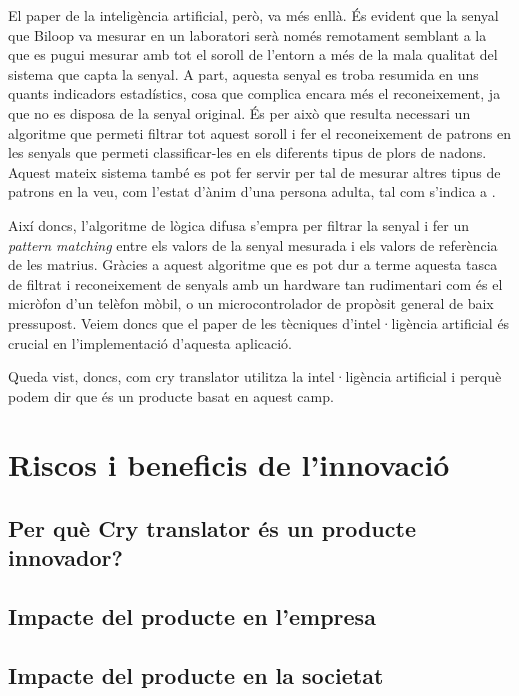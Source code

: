 \documentclass[11pt,a4paper]{article}
\begin{document}
El paper de la inteligència artificial, però, va més enllà. És evident que la senyal que Biloop va mesurar en un laboratori serà només remotament semblant a la que es pugui mesurar amb tot el soroll de l'entorn a més de la mala qualitat del sistema que capta la senyal. A part, aquesta senyal es troba resumida en uns quants indicadors estadístics, cosa que complica encara més el reconeixement, ja que no es disposa de la senyal original. És per això que resulta necessari un algoritme que permeti filtrar tot aquest soroll i fer el reconeixement de patrons en les senyals que permeti classificar-les en els diferents tipus de plors de nadons. Aquest mateix sistema també es pot fer servir per tal de mesurar altres tipus de patrons en la veu, com l'estat d'ànim d'una persona adulta, tal com s'indica a \cite{patent}.

Així doncs, l'algoritme de lògica difusa s'empra per filtrar la senyal i fer un \emph{pattern matching} entre els valors de la senyal mesurada i els valors de referència de les matrius. Gràcies a aquest algoritme que es pot dur a terme aquesta tasca de filtrat i reconeixement de senyals amb un hardware tan rudimentari com és el micròfon d'un telèfon mòbil, o un microcontrolador de propòsit general de baix pressupost. Veiem doncs que el paper de les tècniques d'intel·ligència artificial és crucial en l'implementació d'aquesta aplicació.

Queda vist, doncs, com cry translator utilitza la intel·ligència artificial i perquè podem dir que és un producte basat en aquest camp.

\section{\textsf{Riscos i beneficis de l'innovació}}
\label{riscos-beneficis}

\subsection{\textsf{Per què Cry translator és un producte innovador?}}
\label{justificacio}

\subsection{\textsf{Impacte del producte en l'empresa}}
\label{impacte-empresa}

\subsection{\textsf{Impacte del producte en la societat}}
\label{impacte-societat}
\end{document}
